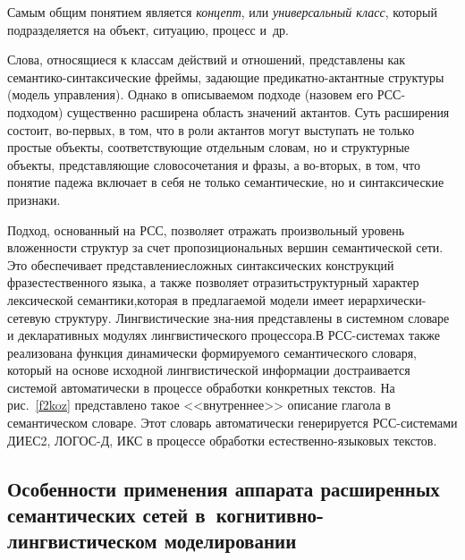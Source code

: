 \begin{multicols}{2}
     Самым общим понятием является \textit{концепт}, или 
\textit{универсальный класс}, который подразделяется на объект, ситуацию, 
процесс и~др. 
     
     Слова, относящиеся к классам действий и отношений, представлены 
как се\-ман\-ти\-ко-син\-так\-си\-че\-ские фреймы, задающие 
     пре\-ди\-кат\-но-ак\-тант\-ные структуры (модель управления). Однако 
в описываемом подходе (назовем его РСС-под\-хо\-дом) существенно 
расширена область значений актантов. Суть расширения состоит, во-первых, 
в том, что в роли актантов могут выступать не только простые объекты, 
соответствующие отдельным словам, но и структурные объекты, 
представляющие словосочетания и фразы, а во-вторых, в том, что понятие 
падежа включает в себя не только семантические, но и синтаксические 
признаки.
     
     Подход, основанный на РСС, позволяет отражать произвольный 
уровень вложенности структур за счет пропозициональных вершин 
семантической сети. Это обеспечивает представление\linebreak сложных 
синтаксических конструкций фраз\linebreak естественного языка, а также позволяет 
отразить\linebreak структурный характер лексической семантики,\linebreak которая в 
предлагаемой модели имеет иерар\-хи\-че\-ски-се\-те\-вую структуру. 
Линг\-ви\-сти\-че\-ские зна-\linebreak ния пред\-став\-ле\-ны в системном словаре и 
декла\-ра\-тивных модулях линг\-ви\-сти\-че\-ско\-го процессора.\linebreak В РСС-сис\-те\-мах 
так\-же реализована функция динамически форми\-ру\-емо\-го семантического 
словаря, который на основе исходной лингвистической информации 
достраивается системой автоматически в процессе об\-ра\-бот\-ки конкретных 
текстов. На рис.~\ref{f2koz} пред\-став\-ле\-но \mbox{такое} <<внутреннее>> описание 
глагола в семантическом словаре. Этот словарь автоматически генерируется 
РСС-системами ДИЕС2, ЛОГОС-Д, ИКС в процессе обработки 
     естест\-вен\-но-язы\-ко\-вых \mbox{текстов}. 
     {
     
     }
     
     
\subsection{Особенности применения аппарата расширенных семантических сетей 
в~когнитивно-лингвистическом моделировании} %
     

\end{multicols}
